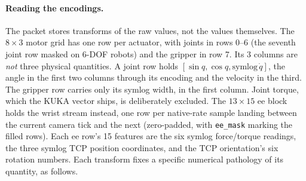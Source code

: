 \documentclass{article}
\begin{document}
\paragraph{Reading the encodings.}
The packet stores transforms of the raw values, not the values themselves. The $8\times3$ motor grid has one row per actuator, with joints in rows 0--6 (the seventh joint row masked on 6-DOF robots) and the gripper in row 7. Its 3 columns are \emph{not} three physical quantities. A joint row holds $[\sin q, \cos q, \mathrm{symlog}\,\dot q]$, the angle in the first two columns through its encoding and the velocity in the third. The gripper row carries only its symlog width, in the first column. Joint torque, which the KUKA vector ships, is deliberately excluded. The $13\times15$ ee block holds the wrist stream instead, one row per native-rate sample landing between the current camera tick and the next (zero-padded, with \texttt{ee\_mask} marking the filled rows). Each ee row's 15 features are the six symlog force/torque readings, the three symlog TCP position coordinates, and the TCP orientation's six rotation numbers. Each transform fixes a specific numerical pathology of its quantity, as follows.
\end{document}
